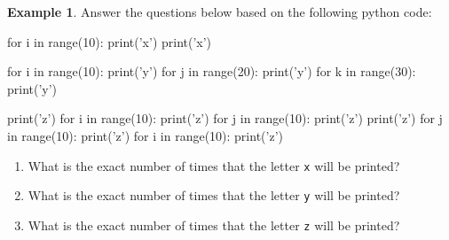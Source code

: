 \documentclass[10pt]{article}
\theoremstyle{definition}
\newtheorem{example}{Example}
\begin{document}
\newpage
\begin{example}
Answer the questions below based on the following python code:
\begin{python}
for i in range(10):
    print('x')
    print('x')

for i in range(10):
    print('y')
    for j in range(20):
        print('y')
        for k in range(30):
            print('y')

print('z')
for i in range(10):
    print('z')
    for j in range(10):
        print('z')
        print('z')
    for j in range(10):
        print('z')
for i in range(10):
    print('z')
\end{python}
    \begin{enumerate}
        \item What is the exact number of times that the letter \texttt{x} will be printed?
            \vspace{1.5in}
        \item What is the exact number of times that the letter \texttt{y} will be printed?
            \vspace{1.5in}
        \item What is the exact number of times that the letter \texttt{z} will be printed?
    \end{enumerate}
\end{example}
\end{document}

